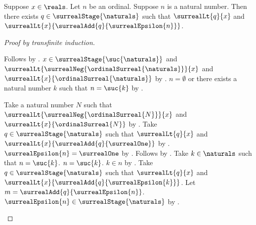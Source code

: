 \begin{theorem}\label{surreal_real_dyadic_interval}
    Suppose $x\in\reals$.
    Let $n$ be an ordinal.
    Suppose $n$ is a natural number.
    Then there exists $q\in\surrealStage{\naturals}$ such that
        $\surrealLt{q}{x}$ and
        $\surrealLt{x}{\surrealAdd{q}{\surrealEpsilon{n}}}$.
\end{theorem}
\begin{proof}[Proof by transfinite induction]
    \begin{byCase}
            Follows by .
            $x\in\surrealStage{\suc{\naturals}}$ and
                $\surrealLt
                    {\surrealNeg{\ordinalSurreal{\naturals}}}{x}$ and
                $\surrealLt{x}{\ordinalSurreal{\naturals}}$
                by .
            $n=\emptyset$ or there exists a natural number $k$ such that
                $n=\suc{k}$ by .
            \begin{byCase}
                    Take a natural number $N$ such that
                        $\surrealLt
                            {\surrealNeg{\ordinalSurreal{N}}}{x}$ and
                        $\surrealLt{x}{\ordinalSurreal{N}}$
                        by
                        .
                    Take $q\in\surrealStage{\naturals}$ such that
                        $\surrealLt{q}{x}$ and
                        $\surrealLt{x}{\surrealAdd{q}{\surrealOne}}$
                        by
                        .
                    $\surrealEpsilon{n}=\surrealOne$
                        by .
                    Follows by \auto.
                    Take $k\in\naturals$ such that $n=\suc{k}$.
                    $n=\suc{k}$.
                    $k\in n$ by .
                    Take $q\in\surrealStage{\naturals}$ such that
                        $\surrealLt{q}{x}$ and
                        $\surrealLt{x}
                            {\surrealAdd{q}{\surrealEpsilon{k}}}$.
                    Let $m=\surrealAdd{q}{\surrealEpsilon{n}}$.
                    $\surrealEpsilon{n}\in
                        \surrealStage{\naturals}$
                        by .

\end{byCase}
\end{byCase}
\end{proof}
